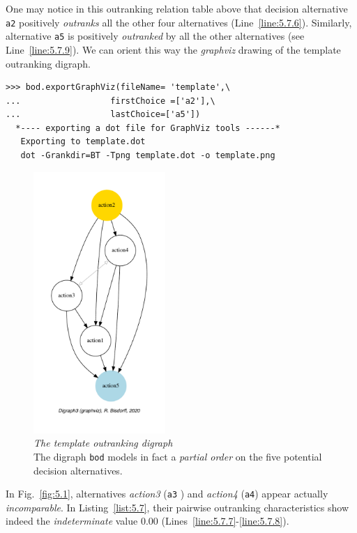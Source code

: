One may notice in this outranking relation table above that decision alternative \texttt{a2} positively \emph{outranks} all the other four alternatives  (Line~\ref{line:5.7.6}). Similarly, alternative \texttt{a5} is positively \emph{outranked} by all the other alternatives (see Line~\ref{line:5.7.9}). We can orient this way the \emph{graphviz} drawing of the template outranking digraph. 
\begin{lstlisting}
>>> bod.exportGraphViz(fileName= 'template',\
...                  firstChoice =['a2'],\
...                  lastChoice=['a5'])
  *---- exporting a dot file for GraphViz tools ------*
   Exporting to template.dot
   dot -Grankdir=BT -Tpng template.dot -o template.png
\end{lstlisting}
\begin{figure}[ht]
\sidecaption[t]
\includegraphics[width=5cm]{Figures/5-1-template.pdf}
\caption[The template outranking digraph]{\emph{The template outranking digraph}\\ The digraph \texttt{bod} models in fact a \emph{partial order} on the five potential decision alternatives.}
\label{fig:5.1}       %
\end{figure}

In Fig.~\vref{fig:5.1}, alternatives \emph{action3} (\texttt{a3} ) and \emph{action4} (\texttt{a4}) appear actually \emph{incomparable}. In Listing~\vref{list:5.7}, their pairwise outranking characteristics show indeed the \emph{indeterminate} value $0.00$ (Lines~\ref{line:5.7.7}-\ref{line:5.7.8}).

